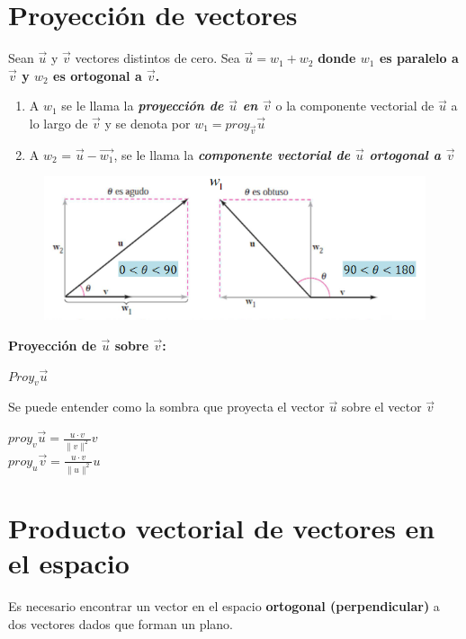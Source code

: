 \documentclass[letterpaper,12pt]{article}
\begin{document}
\begin{sloppypar}
\section{Proyección de vectores}
\noindent Sean $\vec{u}$ y $\vec{v}$ vectores distintos de cero. Sea $\vec{u} = w_1 + w_2$ \textbf{donde $w_1$ es paralelo a $\vec{v}$ y $w_2$ es ortogonal a $\vec{v}$.}
\begin{enumerate}
    \item A $w_1$ se le llama la \textbf{\textit{proyección de $\vec{u}$ en $\vec{v}$}} o la componente vectorial de $\vec{u}$ a lo largo de $\vec{v}$ y se denota por $w_1 = proy_{\vec{v}}\vec{u}$
    \item A $w_2$ = $\vec{u} - \vec{w_1}$, se le llama la \textbf{\textit{componente vectorial de $\vec{u}$ ortogonal a $\vec{v}$}}
\end{enumerate}

\begin{figure}[H]
    \centering
    \includegraphics{images/proyc.PNG}
\end{figure}
\noindent \textbf{Proyección de $\vec{u}$ sobre $\vec{v}$:}

$Proy_v\vec{u}$

\noindent Se puede entender como la sombra que proyecta el vector $\vec{u}$ sobre el vector $\vec{v}$

\begin{center}
    $\displaystyle proy_{v}\vec{u} = \frac{u\cdot v}{\|v \|^2} v$
    \vspace{0.3cm}\\
    $\displaystyle proy_{u}\vec{v} = \frac{u\cdot v}{\|u \|^2} u$
\end{center}

\section{Producto vectorial de vectores en el espacio}
\noindent Es necesario encontrar un vector en el espacio \textbf{ortogonal (perpendicular)} a dos vectores dados que forman un plano. 


\end{sloppypar}
\end{document}
